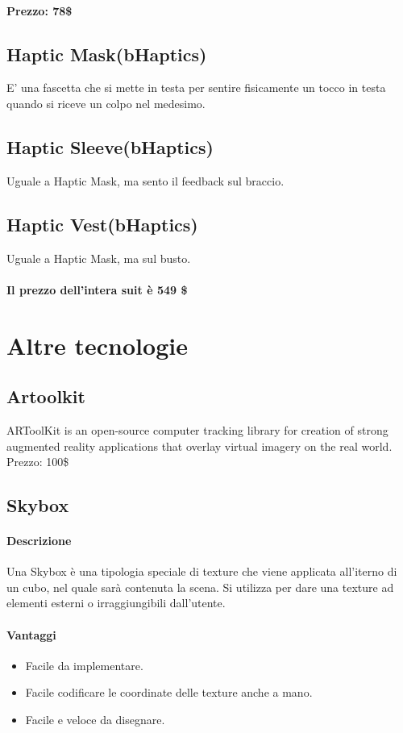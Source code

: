 \documentclass[8pt]{extarticle}
\begin{document}
\begin{multicols}{3}
\paragraph{Prezzo: 78\$}
\subsection{Haptic Mask(bHaptics)}
E' una fascetta che si mette in testa per sentire fisicamente un tocco in testa quando si riceve un colpo nel medesimo.
\subsection{Haptic Sleeve(bHaptics)}
Uguale a Haptic Mask, ma sento il feedback sul braccio.
\subsection{Haptic Vest(bHaptics)}
Uguale a Haptic Mask, ma sul busto.
\paragraph{Il prezzo dell'intera suit è 549 \$} 
\section{Altre tecnologie}
\subsection{Artoolkit}
ARToolKit is an open-source computer tracking library for creation of strong augmented reality applications that overlay virtual imagery on the real world.
Prezzo: 100\$
\subsection{Skybox}
\paragraph{Descrizione} 
Una Skybox è una tipologia speciale di texture che viene applicata all'iterno di un 
cubo, nel quale sarà contenuta la scena. Si utilizza per dare una texture ad elementi
esterni o irraggiungibili dall'utente. 
\paragraph{Vantaggi}
\begin{itemize}
    \item Facile da implementare.
    \item Facile codificare le coordinate delle texture anche a mano.
    \item Facile e veloce da disegnare.
\end{itemize}

\end{multicols}
\end{document}
